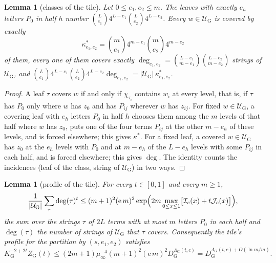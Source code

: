 \documentclass[11pt]{article}
\newtheorem{lemma}[theorem]{Lemma}
\theoremstyle{definition}
\theoremstyle{remark}
\newcommand{\abs}[1]{\lvert #1\rvert}
\newcommand{\UG}{\mathcal U_{\mathrm G}}             %
\newcommand{\LamG}{\Lambda_{\mathrm G}}              %
\newcommand{\Ic}{\mathcal I}                         %
\newcommand{\Jc}{\mathcal J}                         %
\begin{document}
\begin{lemma}[classes of the tile]\label{cp:G8:G}
Let $0\le e_1,e_2\le m$. The leaves with exactly $e_h$ letters $P_0$ in half $h$ number $\binom L{e_1}4^{L-e_1}\binom L{e_2}4^{L-e_2}$. Every $w\in\UG$ is covered by exactly
\[
\kappa^*_{e_1,e_2}=\binom m{e_1}4^{m-e_1}\binom m{e_2}4^{m-e_2}
\]
of them, every one of them covers exactly $\deg_{e_1,e_2}=\binom{L-e_1}{m-e_1}\binom{L-e_2}{m-e_2}$ strings of $\UG$, and $\binom L{e_1}4^{L-e_1}\binom L{e_2}4^{L-e_2}\deg_{e_1,e_2}=\abs\UG\,\kappa^*_{e_1,e_2}$.
\end{lemma}

\begin{proof}
A leaf $\tau$ covers $w$ if and only if $\chi_{\tau_i}$ contains $w_i$ at every level, that is, if $\tau$ has $P_0$ only where $w$ has $z_0$ and has $P_{ij}$ wherever $w$ has $z_{ij}$. For fixed $w\in\UG$, a covering leaf with $e_h$ letters $P_0$ in half $h$ chooses them among the $m$ levels of that half where $w$ has $z_0$, puts one of the four terms $P_{ij}$ at the other $m-e_h$ of these levels, and is forced elsewhere; this gives $\kappa^*$. For a fixed leaf, a covered $w\in\UG$ has $z_0$ at the $e_h$ levels with $P_0$ and at $m-e_h$ of the $L-e_h$ levels with some $P_{ij}$ in each half, and is forced elsewhere; this gives $\deg$. The identity counts the incidences (leaf of the class, string of $\UG$) in two ways.
\end{proof}

\begin{lemma}[profile of the tile]\label{cp:G8:Gp}
For every $t\in[0,1]$ and every $m\ge1$,
\[
\frac1{\abs\UG}\sum_\tau\deg(\tau)^t\le(m+1)^2(\mathrm e\,m)^2\exp\Bigl(2m\max_{0\le x\le1}\bigl[\Ic_c(x)+t\Jc_c(x)\bigr]\Bigr),
\]
the sum over the strings $\tau$ of $2L$ terms with at most $m$ letters $P_0$ in each half and $\deg(\tau)$ the number of strings of $\UG$ that $\tau$ covers. Consequently the tile's profile for the partition by $(s,e_1,e_2)$ satisfies
\[
K_{\mathrm G}^{-2+2t}Z_{\mathrm G}(t)\le(2m+1)\mu_\infty^{-4}(m+1)^2(\mathrm e\,m)^2D_{\mathrm G}^{\LamG(t,c)}=D_{\mathrm G}^{\LamG(t,c)+O(\ln m/m)}.
\]
\end{lemma}
\end{document}
